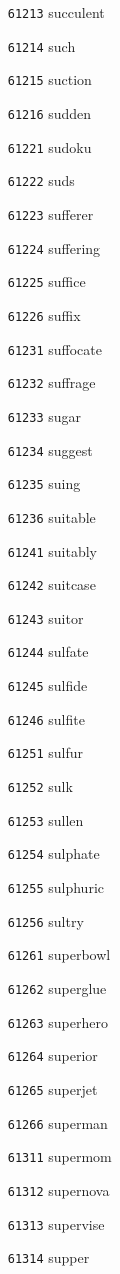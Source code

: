 \documentclass[twoside,11pt]{article}
\begin{document}
\begin{multicols}{5}
\begin{enumerate}
\item[\texttt{61213}] succulent
\item[\texttt{61214}] such
\item[\texttt{61215}] suction
\item[\texttt{61216}] sudden
\item[\texttt{61221}] sudoku
\item[\texttt{61222}] suds
\item[\texttt{61223}] sufferer
\item[\texttt{61224}] suffering
\item[\texttt{61225}] suffice
\item[\texttt{61226}] suffix
\item[\texttt{61231}] suffocate
\item[\texttt{61232}] suffrage
\item[\texttt{61233}] sugar
\item[\texttt{61234}] suggest
\item[\texttt{61235}] suing
\item[\texttt{61236}] suitable
\item[\texttt{61241}] suitably
\item[\texttt{61242}] suitcase
\item[\texttt{61243}] suitor
\item[\texttt{61244}] sulfate
\item[\texttt{61245}] sulfide
\item[\texttt{61246}] sulfite
\item[\texttt{61251}] sulfur
\item[\texttt{61252}] sulk
\item[\texttt{61253}] sullen
\item[\texttt{61254}] sulphate
\item[\texttt{61255}] sulphuric
\item[\texttt{61256}] sultry
\item[\texttt{61261}] superbowl
\item[\texttt{61262}] superglue
\item[\texttt{61263}] superhero
\item[\texttt{61264}] superior
\item[\texttt{61265}] superjet
\item[\texttt{61266}] superman
\item[\texttt{61311}] supermom
\item[\texttt{61312}] supernova
\item[\texttt{61313}] supervise
\item[\texttt{61314}] supper

\end{enumerate}
\end{multicols}
\end{document}
